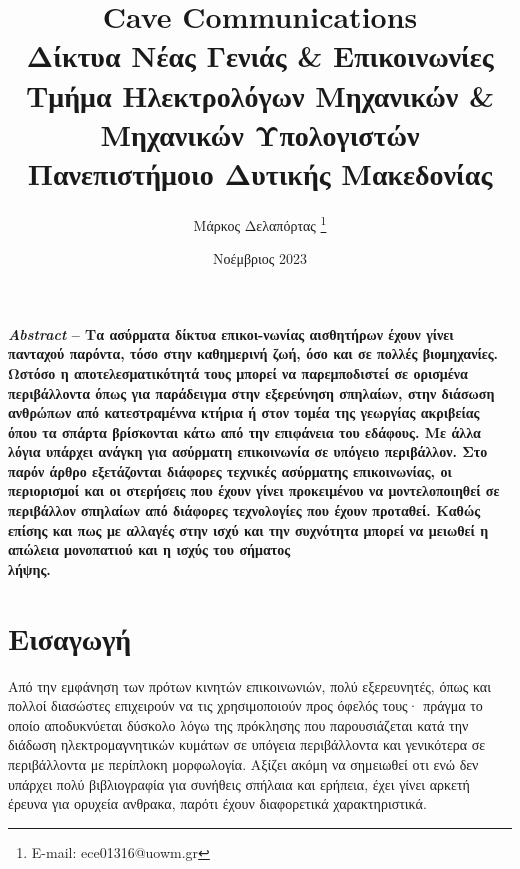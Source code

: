 \documentclass[12pt]{article}
\title{
    \textsf{ Cave Communications}\\
    \textsf{Δίκτυα Νέας Γενιάς \& Επικοινωνίες}\\
    \textsf{\Large Τμήμα Ηλεκτρολόγων Μηχανικών \& Μηχανικών Υπολογιστών}\\
    \textsf{\large Πανεπιστήμοιο Δυτικής Μακεδονίας}
}
\author{\textsf{Μάρκος Δελαπόρτας} \footnote{E-mail: ece01316@uowm.gr}}
\date{\textsf{Νοέμβριος 2023}}
\begin{document}
\maketitle

\begin{multicols*}{2}
    \scriptsize \textbf{ \textit{Abstract} -- Τα ασύρματα δίκτυα επικοι-νωνίας αισθητήρων
        έχουν γίνει πανταχού παρόντα, τόσο στην καθημερινή ζωή, όσο και σε πολλές
        βιομηχανίες. Ωστόσο η αποτελεσματικότητά τους μπορεί να παρεμποδιστεί σε ορισμένα
        περιβάλλοντα όπως για παράδειγμα στην εξερεύνηση σπηλαίων, στην διάσωση ανθρώπων
        από κατεστραμέννα κτήρια ή στον τομέα της γεωργίας ακριβείας όπου τα σπάρτα
        βρίσκονται κάτω από την επιφάνεια του εδάφους. Με άλλα λόγια υπάρχει ανάγκη για
        ασύρματη επικοινωνία σε υπόγειο περιβάλλον. Στο παρόν άρθρο εξετάζονται διάφορες
        τεχνικές ασύρματης επικοινωνίας, οι περιορισμοί και οι στερήσεις που έχουν γίνει
        προκειμένου να μοντελοποιηθεί σε περιβάλλον σπηλαίων από διάφορες τεχνολογίες που
        έχουν προταθεί. Καθώς επίσης και πως με αλλαγές στην ισχύ και την συχνότητα μπορεί
        να μειωθεί η απώλεια μονοπατιού και η ισχύς του σήματος\\
        λήψης. }

    \section{\normalsize \textsf{Εισαγωγή}}
        Από την εμφάνηση των πρότων κινητών επικοινωνιών, πολύ εξερευνητές, όπως και
        πολλοί διασώστες επιχειρούν να τις χρησιμοποιούν προς όφελός τους· πράγμα το οποίο
        αποδυκνύεται δύσκολο λόγω της πρόκλησης που παρουσιάζεται κατά την διάδωση
        ηλεκτρομαγνητικών κυμάτων σε υπόγεια περιβάλλοντα και γενικότερα σε περιβάλλοντα
        με περίπλοκη μορφωλογία. Αξίζει ακόμη να σημειωθεί οτι ενώ δεν υπάρχει πολύ
        βιβλιογραφία για συνήθεις σπήλαια και ερήπεια, έχει γίνει αρκετή έρευνα για
        ορυχεία ανθρακα, παρότι έχουν διαφορετικά χαρακτηριστικά.
    

\end{multicols*}
\end{document}
